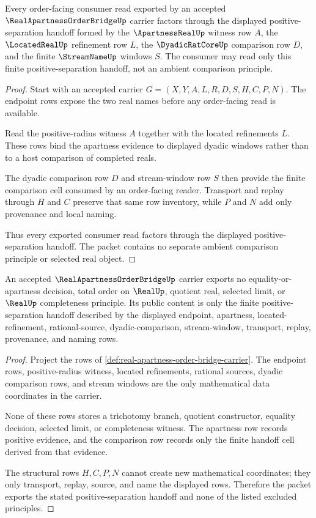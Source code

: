 \begin{theorem}
\label{thm:real-apartness-order-bridge-positive-order-handoff}
Every order-facing consumer read exported by an accepted $\RealApartnessOrderBridgeUp$ carrier factors through the displayed positive-separation handoff formed by the $\ApartnessRealUp$ witness row $A$, the $\LocatedRealUp$ refinement row $L$, the $\DyadicRatCoreUp$ comparison row $D$, and the finite $\StreamNameUp$ windows $S$. The consumer may read only this finite positive-separation handoff, not an ambient comparison principle.
\end{theorem}
\begin{proof}
Start with an accepted carrier $G=(X,Y,A,L,R,D,S,H,C,P,N)$. The endpoint rows expose the two real names before any order-facing read is available.

Read the positive-radius witness $A$ together with the located refinements $L$. These rows bind the apartness evidence to displayed dyadic windows rather than to a host comparison of completed reals.

The dyadic comparison row $D$ and stream-window row $S$ then provide the finite comparison cell consumed by an order-facing reader. Transport and replay through $H$ and $C$ preserve that same row inventory, while $P$ and $N$ add only provenance and local naming.

Thus every exported consumer read factors through the displayed positive-separation handoff. The packet contains no separate ambient comparison principle or selected real object.
\end{proof}

\begin{theorem}
\label{thm:real-apartness-order-bridge-no-trichotomy}
An accepted $\RealApartnessOrderBridgeUp$ carrier exports no equality-or-apartness decision, total order on $\RealUp$, quotient real, selected limit, or $\RealUp$ completeness principle. Its public content is only the finite positive-separation handoff described by the displayed endpoint, apartness, located-refinement, rational-source, dyadic-comparison, stream-window, transport, replay, provenance, and naming rows.
\end{theorem}
\begin{proof}
Project the rows of \autoref{def:real-apartness-order-bridge-carrier}. The endpoint rows, positive-radius witness, located refinements, rational sources, dyadic comparison rows, and stream windows are the only mathematical data coordinates in the carrier.

None of these rows stores a trichotomy branch, quotient constructor, equality decision, selected limit, or completeness witness. The apartness row records positive evidence, and the comparison row records only the finite handoff cell derived from that evidence.

The structural rows $H,C,P,N$ cannot create new mathematical coordinates; they only transport, replay, source, and name the displayed rows. Therefore the packet exports the stated positive-separation handoff and none of the listed excluded principles.
\end{proof}

